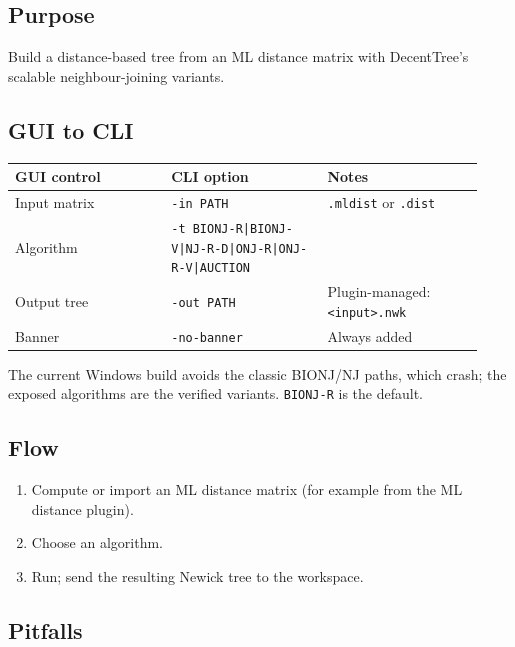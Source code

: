 \documentclass[11pt]{report}
\begin{document}
\subsection{Purpose}

Build a distance-based tree from an ML distance matrix with DecentTree's scalable neighbour-joining variants.

\subsection{GUI to CLI}

{\footnotesize
\begin{longtable}{@{}>{\raggedright\arraybackslash}p{0.31\linewidth}>{\raggedright\arraybackslash}p{0.31\linewidth}>{\raggedright\arraybackslash}p{0.31\linewidth}@{}}
\toprule
GUI control & CLI option & Notes \\
\midrule
\endhead
Input matrix & \texttt{-in PATH} & \texttt{.\allowbreak mldist} or \texttt{.\allowbreak dist} \\
Algorithm & \texttt{-t BIONJ-R|\allowbreak BIONJ-V|\allowbreak NJ-R-D|\allowbreak ONJ-R|\allowbreak ONJ-R-V|\allowbreak AUCTION} &  \\
Output tree & \texttt{-out PATH} & Plugin-managed: \texttt{<input>.\allowbreak nwk} \\
Banner & \texttt{-no-banner} & Always added \\
\bottomrule
\end{longtable}
}

The current Windows build avoids the classic BIONJ/NJ paths, which crash; the exposed algorithms are the verified variants. \texttt{BIONJ-R} is the default.

\subsection{Flow}

\begin{enumerate}
  \item Compute or import an ML distance matrix (for example from the ML distance plugin).
  \item Choose an algorithm.
  \item Run; send the resulting Newick tree to the workspace.
\end{enumerate}

\subsection{Pitfalls}
\end{document}
